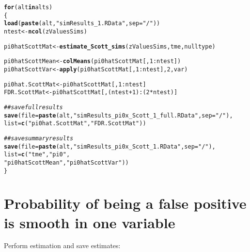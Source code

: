 \documentclass{article}\usepackage[]{graphicx}\usepackage[]{color}
\makeatletter
\newcommand{\hlnum}[1]{\textcolor[rgb]{0.686,0.059,0.569}{#1}}%
\newcommand{\hlstr}[1]{\textcolor[rgb]{0.192,0.494,0.8}{#1}}%
\newcommand{\hlcom}[1]{\textcolor[rgb]{0.678,0.584,0.686}{\textit{#1}}}%
\newcommand{\hlopt}[1]{\textcolor[rgb]{0,0,0}{#1}}%
\newcommand{\hlstd}[1]{\textcolor[rgb]{0.345,0.345,0.345}{#1}}%
\newcommand{\hlkwa}[1]{\textcolor[rgb]{0.161,0.373,0.58}{\textbf{#1}}}%
\newcommand{\hlkwb}[1]{\textcolor[rgb]{0.69,0.353,0.396}{#1}}%
\newcommand{\hlkwc}[1]{\textcolor[rgb]{0.333,0.667,0.333}{#1}}%
\newcommand{\hlkwd}[1]{\textcolor[rgb]{0.737,0.353,0.396}{\textbf{#1}}}%
\newenvironment{kframe}{%
 \def\at@end@of@kframe{}%
 \ifinner\ifhmode%
  \def\at@end@of@kframe{\end{minipage}}%
  \begin{minipage}{\columnwidth}%
 \fi\fi%
 \def\FrameCommand##1{\hskip\@totalleftmargin \hskip-\fboxsep
 \colorbox{shadecolor}{##1}\hskip-\fboxsep
     \hskip-\linewidth \hskip-\@totalleftmargin \hskip\columnwidth}%
 \MakeFramed {\advance\hsize-\width
   \@totalleftmargin\z@ \linewidth\hsize
   \@setminipage}}%
 {\par\unskip\endMakeFramed%
 \at@end@of@kframe}
\newenvironment{knitrout}{}{} %
\makeatother
\begin{document}
\begin{knitrout}
\color{fgcolor}\begin{kframe}
\begin{alltt}
\hlkwa{for}\hlstd{(alt} \hlkwa{in} \hlstd{alts)}
\hlstd{\{}
  \hlkwd{load}\hlstd{(}\hlkwd{paste}\hlstd{(alt,}\hlstr{"simResults_1.RData"}\hlstd{,}\hlkwc{sep}\hlstd{=}\hlstr{"/"}\hlstd{))}
  \hlstd{ntest} \hlkwb{<-} \hlkwd{ncol}\hlstd{(zValuesSims)}

  \hlstd{pi0hatScottMat} \hlkwb{<-} \hlkwd{estimate_Scott_sims}\hlstd{(zValuesSims, tme, nulltype)}

  \hlstd{pi0hatScottMean} \hlkwb{<-} \hlkwd{colMeans}\hlstd{(pi0hatScottMat[,}\hlnum{1}\hlopt{:}\hlstd{ntest])}
  \hlstd{pi0hatScottVar} \hlkwb{<-} \hlkwd{apply}\hlstd{(pi0hatScottMat[,}\hlnum{1}\hlopt{:}\hlstd{ntest],}\hlnum{2}\hlstd{,var)}

  \hlstd{pi0hat.ScottMat} \hlkwb{<-} \hlstd{pi0hatScottMat[,}\hlnum{1}\hlopt{:}\hlstd{ntest]}
  \hlstd{FDR.ScottMat} \hlkwb{<-} \hlstd{pi0hatScottMat[,(ntest}\hlopt{+}\hlnum{1}\hlstd{)}\hlopt{:}\hlstd{(}\hlnum{2}\hlopt{*}\hlstd{ntest)]}

  \hlcom{##save full results}
  \hlkwd{save}\hlstd{(}\hlkwc{file}\hlstd{=}\hlkwd{paste}\hlstd{(alt,}\hlstr{"simResults_pi0x_Scott_1_full.RData"}\hlstd{,}\hlkwc{sep}\hlstd{=}\hlstr{"/"}\hlstd{),}
       \hlkwc{list}\hlstd{=}\hlkwd{c}\hlstd{(}\hlstr{"pi0hat.ScottMat"}\hlstd{,} \hlstr{"FDR.ScottMat"}\hlstd{))}

  \hlcom{##save summary results}
  \hlkwd{save}\hlstd{(}\hlkwc{file}\hlstd{=}\hlkwd{paste}\hlstd{(alt,}\hlstr{"simResults_pi0x_Scott_1.RData"}\hlstd{,}\hlkwc{sep}\hlstd{=}\hlstr{"/"}\hlstd{),}
       \hlkwc{list}\hlstd{=}\hlkwd{c}\hlstd{(}\hlstr{"tme"}\hlstd{,} \hlstr{"pi0"}\hlstd{,}
            \hlstr{"pi0hatScottMean"}\hlstd{,}\hlstr{"pi0hatScottVar"}\hlstd{))}
\hlstd{\}}
\end{alltt}
\end{kframe}
\end{knitrout}

\section{Probability of being a false positive is smooth in one variable}

Perform estimation and save estimates:
\end{document}
